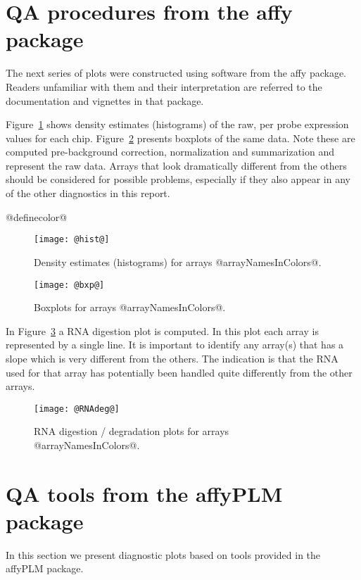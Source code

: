 \documentclass[11pt]{article}
\newcommand{\Rpackage}[1]{{\textsf{#1}}}
\begin{document}
\section{QA procedures from the \Rpackage{affy} package}

The next series of plots were constructed using software from the 
\Rpackage{affy} package. Readers unfamiliar with them and their
interpretation are referred to the documentation and vignettes in
that package.

Figure~\ref{fig:hist} shows density estimates (histograms) of the raw, 
per probe expression values for each chip. Figure~\ref{fig:bxp}
presents boxplots of the same data.  Note these are computed pre-background
correction, normalization and summarization and represent the raw
data. Arrays that look dramatically different from the others should be 
considered for possible problems, especially if they also appear in any
of the other diagnostics in this report.

@definecolor@

\begin{figure}[tp]
  \centering
\texttt{[image: @hist@]}
\caption{\label{fig:hist}%
Density estimates (histograms) for arrays @arrayNamesInColors@.}
\end{figure}

\begin{figure}[tp]
  \centering
\texttt{[image: @bxp@]}
\caption{\label{fig:bxp}%
Boxplots for arrays @arrayNamesInColors@.}
\end{figure}


In Figure~\ref{fig:rnadeg} a RNA digestion plot is computed. In this plot
each array is represented by a single line. It is important to identify 
any array(s) that has a slope which is very different from the others. 
The indication is that the RNA used for that array has potentially 
been handled quite differently from the other arrays. 

\begin{figure}[tp]
  \centering
\texttt{[image: @RNAdeg@]}
\caption{\label{fig:rnadeg}%
RNA digestion / degradation plots for arrays @arrayNamesInColors@.}
\end{figure}

\section{QA tools from the \Rpackage{affyPLM} package}

In this section we present diagnostic plots based on tools provided
in the \Rpackage{affyPLM} package.
\end{document}
